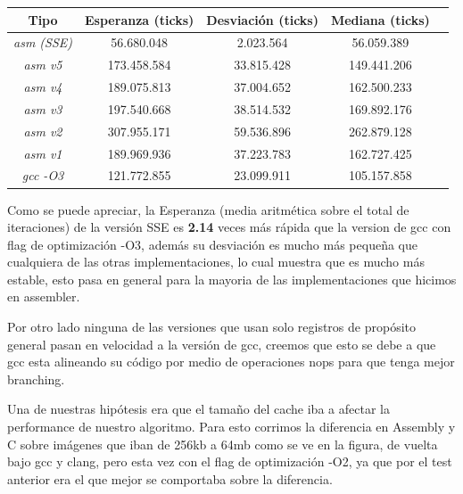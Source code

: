 \documentclass[a4paper]{article}
\begin{document}
\begin{center}
        \begin{tabular}[c]{|c|c|c|c|c|}
    \hline
        \textbf{Tipo} &  \textbf{Esperanza (ticks)} & \textbf{Desviación (ticks)} & \textbf{Mediana (ticks)}\\
        \hline
\textit{asm (SSE)} &    56.680.048  & 2.023.564 & 56.059.389\\
        \hline
\textit{asm v5} &   173.458.584    & 33.815.428 & 149.441.206\\
        \hline
\textit{asm v4} &   189.075.813    & 37.004.652 & 162.500.233 \\
        \hline
\textit{asm v3} &  197.540.668  & 38.514.532 & 169.892.176\\
        \hline
\textit{asm v2} &  307.955.171   & 59.536.896 & 262.879.128\\
        \hline
\textit{asm v1} &  189.969.936 & 37.223.783 & 162.727.425\\
        \hline
\textit{gcc -O3} &  121.772.855 & 23.099.911 & 105.157.858\\
        \hline
    \end{tabular}
\end{center}

Como se puede apreciar, la Esperanza (media aritmética sobre el total de iteraciones) de la versión SSE es \textbf{2.14} veces más rápida que la version de gcc con flag de optimización -O3, además su desviación es mucho más pequeña que cualquiera de las otras implementaciones, lo cual muestra que es mucho más estable, esto pasa en general para la mayoria de las implementaciones que hicimos en assembler.

Por otro lado ninguna de las versiones que usan solo registros de propósito general pasan en velocidad a la versión de gcc, creemos que esto se debe a que gcc esta alineando su código por medio de operaciones nops para que tenga mejor branching.



Una de nuestras hipótesis era que el tamaño del cache iba a afectar la performance de nuestro algoritmo. Para esto corrimos la diferencia en Assembly y C sobre imágenes que iban de 256kb a 64mb como se ve en la figura, de vuelta bajo gcc y clang, pero esta vez con el flag de optimización -O2, ya que por el test anterior era el que mejor se comportaba sobre la diferencia.  
\end{document}
